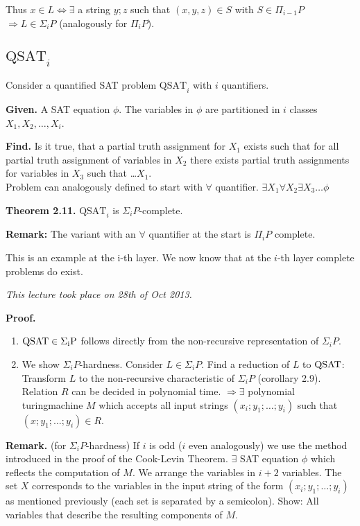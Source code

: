 \documentclass[a4paper]{article}
\newcommand{\given}[1]{\textbf{Given.} #1\par}
\newcommand{\find}[1]{\textbf{Find.} #1\par}
\newcommand{\cls}[1]{\rm{#1}}
\newcommand{\dateref}[1]{\emph{This lecture took place on #1.}\par}
\newenvironment{spec}[0]{\begin{framed}}{\end{framed}}
\begin{document}
Thus $x \in L \Leftrightarrow \exists$ a string $y;z$ such that
$(x,y,z) \in S$ with $S \in \Pi_{i-1} P$ $\Rightarrow L \in \Sigma_i P$
(analogously for $\Pi_i P$).

\subsection{$\text{QSAT}_i$}
%
Consider a quantified SAT problem $\text{QSAT}_i$ with $i$ quantifiers.

\begin{spec}
\given{
  A SAT equation $\phi$.
  The variables in $\phi$ are partitioned in $i$ classes $X_1, X_2, \ldots, X_i$. \\
}
\find{
  Is it true, that a partial truth assignment for $X_1$ exists such that
  for all partial truth assignment of variables in $X_2$ there
  exists partial truth assignments for variables in $X_3$ such that
  \dots $X_1$. \\
  Problem can analogously defined to start with $\forall$ quantifier.
  $\exists X_1 \forall X_2 \exists X_3 \ldots \phi$
}
\end{spec}

\textbf{Theorem 2.11.}
$\text{QSAT}_i$ is $\Sigma_i P$-complete.

\textbf{Remark:}
The variant with an $\forall$ quantifier at the start is
$\Pi_i P$ complete.

This is an example at the i-th layer. We now know that at the $i$-th
layer complete problems do exist.

\dateref{28th of Oct 2013}

\textbf{Proof.}
\begin{enumerate}
  \item $\cls{QSAT} \in \Sigma_i P$ follows directly from the
        non-recursive representation of $\Sigma_i P$.
  \item We show $\Sigma_i P$-hardness. Consider $L \in \Sigma_i P$.
        Find a reduction of $L$ to $\cls{QSAT}$:
        Transform $L$ to the non-recursive characteristic of $\Sigma_i P$
        (corollary 2.9). Relation $R$ can be decided in polynomial time.
        $\Rightarrow \exists$ polynomial turingmachine $M$ which accepts
        all input strings $(x_i; y_1; \ldots; y_i)$ such that $(x; y_1;
        \ldots; y_i) \in R$.
\end{enumerate}

\textbf{Remark.} (for $\Sigma_i P$-hardness) If $i$ is odd ($i$ even
analogously) we use the method introduced in the proof of the Cook-Levin Theorem.
$\exists$ SAT equation $\phi$ which reflects the computation of $M$.
We arrange the variables in $i+2$ variables. The set $X$ corresponds
to the variables in the input string of the form $(x_i; y_1; \ldots; y_i)$
as mentioned previously (each set is separated by a semicolon).
Show: All variables that describe the resulting components of $M$.
\end{document}
